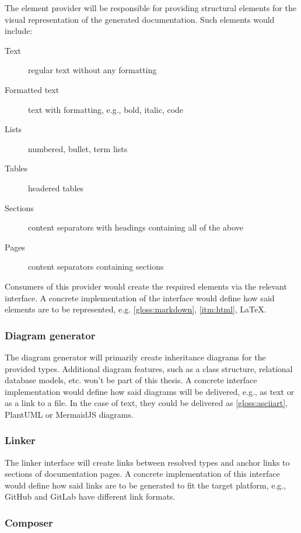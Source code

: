 The element provider will be responsible for providing structural elements for the visual representation of the generated documentation. Such elements would include:
\begin{description}
    \item[Text] regular text without any formatting
    \item[Formatted text] text with formatting, e.g., bold, italic, code
    \item[Lists] numbered, bullet, term lists
    \item[Tables] headered tables
    \item[Sections] content separators with headings containing all of the above
    \item[Pages] content separators containing sections
\end{description}

Consumers of this provider would create the required elements via the relevant interface.
A concrete implementation of the interface would define how said elements are to be represented, e.g. \ref{gloss:markdown}, \ref{itm:html}, \LaTeX.

\subsubsection{Diagram generator}

The diagram generator will primarily create inheritance diagrams for the provided types. Additional diagram features, such as a class structure, relational database models, etc. won't be part of this thesis.
A concrete interface implementation would define how said diagrams will be delivered, e.g., as text or as a link to a file.
In the case of text, they could be delivered as \ref{gloss:asciiart}, PlantUML or MermaidJS diagrams.

\subsubsection{Linker}

The linker interface will create links between resolved types and anchor links to sections of documentation pages.
A concrete implementation of this interface would define how said links are to be generated to fit the target platform, e.g., GitHub and GitLab have different link formats.

\subsubsection{Composer} \label{sec:composer}

